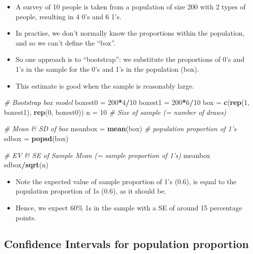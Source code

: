 \documentclass[]{article}
\newenvironment{Shaded}{\begin{snugshade}}{\end{snugshade}}
\newcommand{\CommentTok}[1]{\textcolor[rgb]{0.56,0.35,0.01}{\textit{#1}}}
\newcommand{\DecValTok}[1]{\textcolor[rgb]{0.00,0.00,0.81}{#1}}
\newcommand{\KeywordTok}[1]{\textcolor[rgb]{0.13,0.29,0.53}{\textbf{#1}}}
\newcommand{\NormalTok}[1]{#1}
\newcommand{\OperatorTok}[1]{\textcolor[rgb]{0.81,0.36,0.00}{\textbf{#1}}}
\newcommand{\StringTok}[1]{\textcolor[rgb]{0.31,0.60,0.02}{#1}}
\providecommand{\tightlist}{%
  \setlength{\itemsep}{0pt}\setlength{\parskip}{0pt}}
\begin{document}
\begin{itemize}
\tightlist
\item
  A survey of 10 people is taken from a population of size 200 with 2 types of people, resulting in 4 0's and 6 1's.
\item
  In practise, we don't normally know the proportions within the population, and so we can't define the ``box''.
\item
  So one approach is to ``bootstrap'': we substitute the proportions of 0's and 1's in the sample for the 0's and 1's in the population (box).
\item
  This estimate is good when the sample is reasonably large.
\end{itemize}

\begin{Shaded}
\begin{Highlighting}[]
\CommentTok{# Bootstrap box model}
\NormalTok{boxest0 =}\StringTok{ }\DecValTok{200}\OperatorTok{*}\DecValTok{4}\OperatorTok{/}\DecValTok{10}
\NormalTok{boxest1 =}\StringTok{ }\DecValTok{200}\OperatorTok{*}\DecValTok{6}\OperatorTok{/}\DecValTok{10}
\NormalTok{box =}\StringTok{ }\KeywordTok{c}\NormalTok{(}\KeywordTok{rep}\NormalTok{(}\DecValTok{1}\NormalTok{, boxest1), }\KeywordTok{rep}\NormalTok{(}\DecValTok{0}\NormalTok{, boxest0))}
\NormalTok{n =}\StringTok{ }\DecValTok{10} \CommentTok{# Size of sample (= number of draws)}

\CommentTok{# Mean & SD of box}
\NormalTok{meanbox =}\StringTok{ }\KeywordTok{mean}\NormalTok{(box)  }\CommentTok{# population proportion of 1's}
\NormalTok{sdbox =}\StringTok{ }\KeywordTok{popsd}\NormalTok{(box)}

\CommentTok{# EV & SE of Sample Mean (= sample proportion of 1's)}
\NormalTok{meanbox}
\NormalTok{sdbox}\OperatorTok{/}\KeywordTok{sqrt}\NormalTok{(n)}
\end{Highlighting}
\end{Shaded}

\begin{itemize}
\item
  Note the expected value of sample proportion of 1's (0.6), is equal to the population proportion of 1s (0.6), as it should be.
\item
  Hence, we expect 60\% 1s in the sample with a SE of around 15 percentage points.
\end{itemize}

\hypertarget{confidence-intervals-for-population-proportion}{%
\subsection{Confidence Intervals for population proportion}\label{confidence-intervals-for-population-proportion}}
\end{document}
